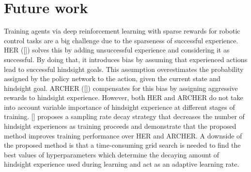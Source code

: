 \documentclass[conference]{IEEEtran}
\begin{document}
\section{Future work} \label{sec:future_work}
Training agents via deep reinforcement learning with sparse rewards for robotic control tasks are a big challenge due to the sparseness of successful experience. HER ([\cite{andrychowicz2017hindsight}]) solves this by adding unsuccessful experience and considering it as successful. By doing that, it introduces bias by assuming that experienced actions lead to successful hindsight goals. This assumption overestimates the probability assigned by the policy network to the action, given the current state and hindsight goal. ARCHER ([\cite{lanka2018archer}]) compensates for this bias by assigning aggressive rewards to hindsight experience. However, both HER and ARCHER do not take into account variable importance of hindsight experience at different stages of training. [\cite{vecchietti2020sampling}] proposes a sampling rate decay strategy that decreases the number of hindsight experiences as training proceeds and demonstrate that the proposed method improves training performance over HER and ARCHER. A downside of the proposed method is that a time-consuming grid search is needed to find the best values of hyperparameters which determine the decaying amount of hindsight experience used during learning and act as an adaptive learning rate.
\end{document}
